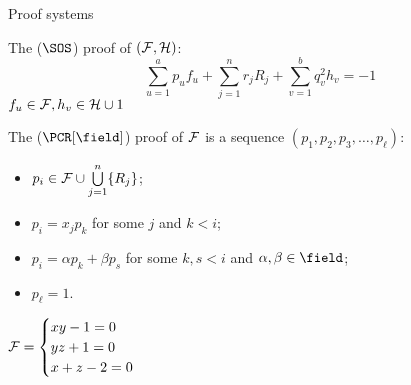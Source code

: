\begin{frame}{Proof systems}

    The  ($\SOS$) proof of $(\Fs, \Hs)$:
    $$
        \sum_{u = 1}^{a} p_u f_u + \sum_{j = 1}^{n} r_j R_j + \sum_{v = 1}^{b} q_v^2 h_v = -1
    $$
    $f_u \in \Fs, h_v \in \Hs \cup {1}$

    \pause
    \vspace{0.4cm}

    The  ($\PCR[\field]$) proof of $\Fs$ is a sequence
    $(p_1, p_2, p_3, \dots, p_{\ell})$:
    \pause
    \begin{itemize}
        \item $p_i \in \Fs \cup \bigcup\limits_{j = 1}^{n} \{R_j\}$;
        \pause
        \item $p_i = x_j p_k$ for some $j$ and $k < i$;
        \pause    
        \item $p_i = \alpha p_k + \beta p_s$ for some $k, s < i$ and $\alpha, \beta \in \field$;
        \pause
            \item $p_{\ell} = 1$.
    \end{itemize}

    \pause
    \vspace{-0.2cm}
    \begin{minipage}{0.4\linewidth}
        $\Fs =
        \begin{cases}
            xy - 1 = 0 \\
            yz + 1 = 0 \\
            x + z - 2 = 0
        \end{cases}$
    \end{minipage}
    \pause
    \begin{minipage}{0.58\linewidth}
        \begin{prooftree}
        \end{prooftree}
    \end{minipage}
\end{frame}


